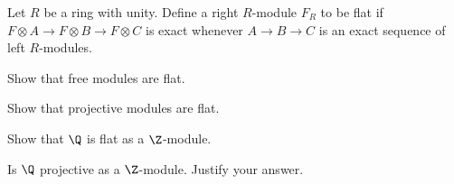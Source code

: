 Let $R$ be a ring with unity. Define a right $R$-module $F_R$ to be
flat if $F\otimes A\rightarrow F\otimes B\rightarrow F\otimes C$ is
exact whenever $A\rightarrow B\rightarrow C$ is an exact sequence of
left $R$-modules.
\begin{alist}
\item Show that free modules are flat.
\item Show that projective modules are flat.
\item Show that $\Q$ is flat as a $\Z$-module.
\item Is $\Q$ projective as a $\Z$-module. Justify your answer.
\end{alist}
